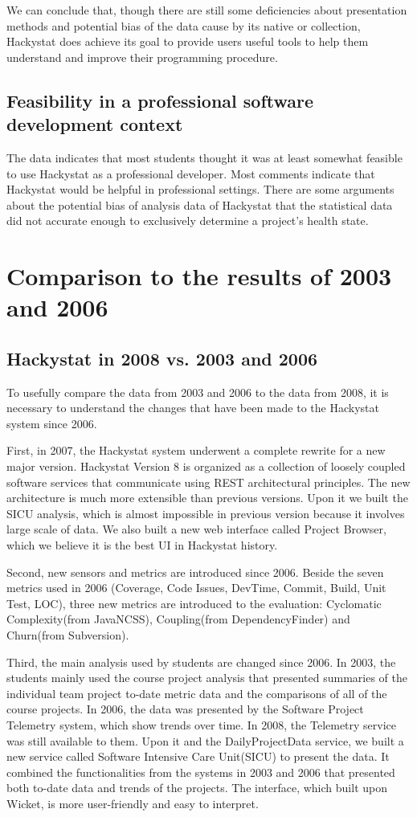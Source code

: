 \documentclass[11pt]{article}
\begin{document}
We can conclude that, though there are still some deficiencies about presentation methods and potential bias of the data cause by its native or collection, Hackystat does achieve its goal to provide users useful tools to help them understand and improve their programming procedure.


\subsection {Feasibility in a professional software development context}
The data indicates that most students thought it was at least somewhat feasible to use Hackystat as a professional developer. Most comments indicate that Hackystat would be helpful in professional settings. There are some arguments about the potential bias of analysis data of Hackystat that the statistical data did not accurate enough to exclusively determine a project's health state.

\section{Comparison to the results of 2003 and 2006}
\subsection{Hackystat in 2008 vs. 2003 and 2006}
To usefully compare the data from 2003 and 2006 to the data from 2008, it is necessary to understand the changes that have been made to the Hackystat system since 2006.

First, in 2007, the Hackystat system underwent a complete rewrite for a new major version. Hackystat Version 8 is organized as a collection of loosely coupled software services that communicate using REST architectural principles. The new architecture is much more extensible than previous versions. Upon it we built the SICU analysis, which is almost impossible in previous version because it involves large scale of data. We also built a new web interface called Project Browser, which we believe it is the best UI in Hackystat history.

Second, new sensors and metrics are introduced since 2006. Beside the seven metrics used in 2006 (Coverage, Code Issues, DevTime, Commit, Build, Unit Test, LOC), three new metrics are introduced to the evaluation: Cyclomatic Complexity(from JavaNCSS), Coupling(from DependencyFinder) and Churn(from Subversion).

Third, the main analysis used by students are changed since 2006. In 2003, the students mainly used the course project analysis that presented summaries of the individual team project to-date metric data and the comparisons of all of the course projects. In 2006, the data was presented by the Software Project Telemetry system, which show trends over time. In 2008, the Telemetry service was still available to them. Upon it and the DailyProjectData service, we built a new service called Software Intensive Care Unit(SICU) to present the data. It combined the functionalities from the systems in 2003 and 2006 that presented both to-date data and trends of the projects. The interface, which built upon Wicket, is more user-friendly and easy to interpret.
\end{document}
